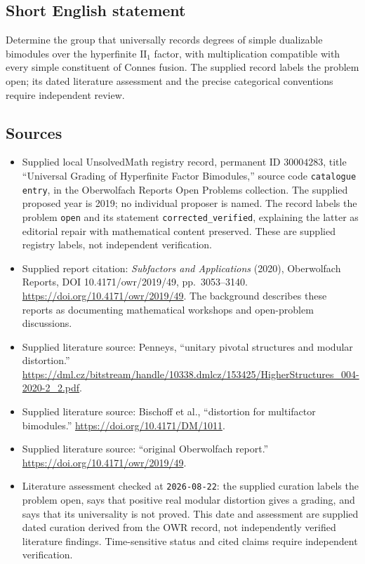 \documentclass[11pt]{article}
\begin{document}
\subsection{Short English statement}
Determine the group that universally records degrees of simple dualizable bimodules over the hyperfinite \(\mathrm{II}_1\) factor, with multiplication compatible with every simple constituent of Connes fusion. The supplied record labels the problem open; its dated literature assessment and the precise categorical conventions require independent review.
\subsection{Sources}
\begin{itemize}
\item Supplied local UnsolvedMath registry record, permanent ID \(30004283\), title ``Universal Grading of Hyperfinite Factor Bimodules,'' source code \texttt{catalogue entry}, in the Oberwolfach Reports Open Problems collection. The supplied proposed year is 2019; no individual proposer is named. The record labels the problem \texttt{open} and its statement \texttt{corrected\_verified}, explaining the latter as editorial repair with mathematical content preserved. These are supplied registry labels, not independent verification.
\item Supplied report citation: \emph{Subfactors and Applications} (2020), Oberwolfach Reports, DOI 10.4171/owr/2019/49, pp.~3053--3140. \url{https://doi.org/10.4171/owr/2019/49}. The background describes these reports as documenting mathematical workshops and open-problem discussions.
\item Supplied literature source: Penneys, ``unitary pivotal structures and modular distortion.'' \url{https://dml.cz/bitstream/handle/10338.dmlcz/153425/HigherStructures_004-2020-2_2.pdf}.
\item Supplied literature source: Bischoff et al., ``distortion for multifactor bimodules.'' \url{https://doi.org/10.4171/DM/1011}.
\item Supplied literature source: ``original Oberwolfach report.'' \url{https://doi.org/10.4171/owr/2019/49}.
\item Literature assessment checked at \texttt{2026-08-22}: the supplied curation labels the problem open, says that positive real modular distortion gives a grading, and says that its universality is not proved. This date and assessment are supplied dated curation derived from the OWR record, not independently verified literature findings. Time-sensitive status and cited claims require independent verification.
\end{itemize}
\end{document}
